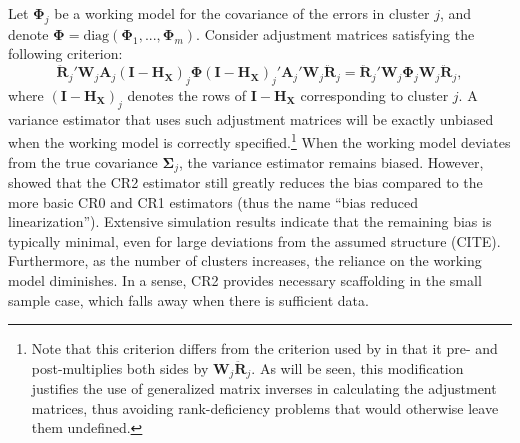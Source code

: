 \documentclass[12pt]{article}\usepackage[]{graphicx}\usepackage[]{color}
\newcommand{\bm}{\mathbf}
\newcommand{\bs}{\boldsymbol}
\begin{document}
Let $\bs\Phi_j$ be a working model for the covariance of the errors in cluster $j$, and denote $\bs\Phi = \text{diag}\left(\bs\Phi_1,...,\bs\Phi_m\right)$. Consider adjustment matrices satisfying the following criterion:
\begin{equation}
\label{eq:CR2_criterion}
\bm{\ddot{R}}_j' \bm{W}_j \bm{A}_j \left(\bm{I} - \bm{H_X}\right)_j \bs\Phi \left(\bm{I} - \bm{H_X}\right)_j' \bm{A}_j' \bm{W}_j \bm{\ddot{R}}_j = \bm{\ddot{R}}_j' \bm{W}_j \bs\Phi_j \bm{W}_j \bm{\ddot{R}}_j,
\end{equation}
where $\left(\bm{I} - \bm{H_X}\right)_j$ denotes the rows of $\bm{I} - \bm{H_X}$ corresponding to cluster $j$. 
A variance estimator that uses such adjustment matrices will be exactly unbiased when the working model is correctly specified.\footnote{Note that this criterion differs from the criterion used by \citet{Bell2002bias} in that it pre- and post-multiplies both sides by $\bm{W}_j\bm{\ddot{R}}_j$. 
As will be seen, this modification justifies the use of generalized matrix inverses in calculating the adjustment matrices, thus avoiding rank-deficiency problems that would otherwise leave them undefined.}
When the working model deviates from the true covariance $\bs{\Sigma}_j$, the variance estimator remains biased. However, \citet{Bell2002bias} showed that the CR2 estimator still greatly reduces the bias compared to the more basic CR0 and CR1 estimators (thus the name ``bias reduced linearization''). 
Extensive simulation results indicate that the remaining bias is typically minimal, even for large deviations from the assumed structure (CITE).
Furthermore, as the number of clusters increases, the reliance on the working model diminishes. 
In a sense, CR2 provides necessary scaffolding in the small sample case, which falls away when there is sufficient data.
\end{document}
